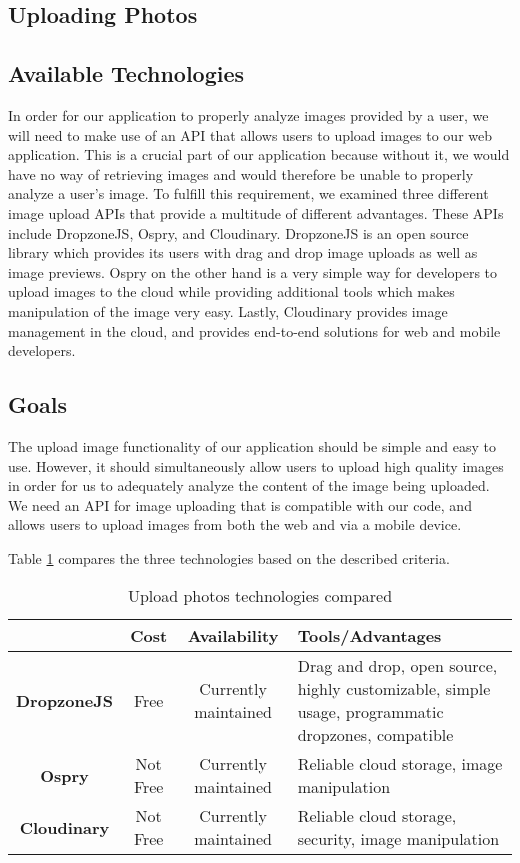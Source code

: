 \documentclass[onecolumn, draftclsnofoot,10pt, compsoc]{IEEEtran}
\begin{document}
\begin{flushleft}
\section{Uploading Photos}
\subsection{Available Technologies}
In order for our application to properly analyze images provided by a user, we will need to make use of an API that allows users to upload images to our web application. This is a crucial part of our application because without it, we would have no way of retrieving images and would therefore be unable to properly analyze a user's image. To fulfill this requirement, we examined three different image upload APIs that provide a multitude of different advantages. These APIs include DropzoneJS, Ospry, and Cloudinary. DropzoneJS is an open source library which provides its users with drag and drop image uploads as well as image previews\cite{14}. Ospry on the other hand is a very simple way for developers to upload images to the cloud while providing additional tools which makes manipulation of the image very easy\cite{16}. Lastly, Cloudinary provides image management in the cloud, and provides end-to-end solutions for web and mobile developers\cite{15}.
\subsection{Goals}
The upload image functionality of our application should be simple and easy to use. However, it should simultaneously allow users to upload high quality images in order for us to adequately analyze the content of the image being uploaded. We need an API for image uploading that is compatible with our code, and allows users to upload images from both the web and via a mobile device.
\medskip


Table \ref{table:4} compares the three technologies based on the described criteria. \cite{14} \cite{15} \cite{16} \cite{25}
\begin{table}[h!]
\caption{Upload photos technologies compared}\label{table:4}
\centering
	\begin{tabular}{| c | c | c | p{7cm} |} 
		\hline
		 & Cost & Availability & Tools/Advantages \\ [0.5ex] 
		\hline
		\textbf{DropzoneJS} & Free & Currently maintained & Drag and drop, open source, highly customizable, simple usage, programmatic dropzones, compatible \\ 
		\hline
		\textbf{Ospry} & Not Free & Currently maintained & Reliable cloud storage, image manipulation  \\
		\hline
		\textbf{Cloudinary} & Not Free & Currently maintained & Reliable cloud storage, security, image manipulation \\
		\hline
	\end{tabular}
\end{table}


\end{flushleft}
\end{document}
